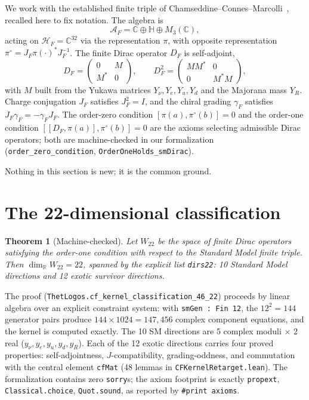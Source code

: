 \documentclass[aps,prd,twocolumn,superscriptaddress,showpacs]{revtex4-2}
\newtheorem{theorem}{Theorem}
\begin{document}
We work with the established finite triple of
Chamseddine--Connes--Marcolli~\cite{CC2007,CCM2007}, recalled here
to fix notation. The algebra is
\begin{equation}
\mathcal{A}_F = \mathbb{C} \oplus \mathbb{H} \oplus M_3(\mathbb{C}),
\end{equation}
acting on $\mathcal{H}_F = \mathbb{C}^{32}$ via the representation
$\pi$, with opposite representation $\pi^\circ = J_F \pi(\cdot)^*
J_F^{-1}$. The finite Dirac operator $D_F$ is self-adjoint,
\[
D_F = \begin{pmatrix} 0 & M \\ M^* & 0 \end{pmatrix},
\qquad D_F^2 = \begin{pmatrix} MM^* & 0 \\ 0 & M^*M \end{pmatrix},
\]
with $M$ built from the Yukawa matrices
$Y_\nu, Y_e, Y_u, Y_d$ and the Majorana mass $Y_R$.
Charge conjugation $J_F$ satisfies $J_F^2 = I$, and the chiral
grading $\gamma_F$ satisfies $J_F \gamma_F = -\gamma_F J_F$.
The order-zero condition $[\pi(a), \pi^\circ(b)] = 0$ and the
order-one condition $[[D_F, \pi(a)], \pi^\circ(b)] = 0$ are the
axioms selecting admissible Dirac operators; both are
machine-checked in our formalization
(\texttt{order\_zero\_condition}, \texttt{OrderOneHolds\_smDirac}).

Nothing in this section is new; it is the common ground.

\section{The 22-dimensional classification}

\begin{theorem}[Machine-checked]
Let $W_{22}$ be the space of finite Dirac operators satisfying
the order-one condition with respect to the Standard Model
finite triple. Then $\dim_{\mathbb{R}} W_{22} = 22$, spanned by
the explicit list \texttt{dirs22}: 10 Standard Model directions
and 12 exotic survivor directions.
\end{theorem}

The proof (\texttt{ThetLogos.cf\_kernel\_classification\_46\_22})
proceeds by linear algebra over an explicit constraint system:
with \texttt{smGen : Fin 12}, the $12^2 = 144$ generator pairs
produce $144 \times 1024 = 147{,}456$ complex component equations,
and the kernel is computed exactly. The 10 SM directions are
5 complex moduli $\times$ 2 real
($y_\nu, y_e, y_u, y_d, y_R$). Each of the 12 exotic directions
carries four proved properties: self-adjointness,
$J$-compatibility, grading-oddness, and commutation with the
central element \texttt{cfMat} (48 lemmas in
\texttt{CFKernelRetarget.lean}). The formalization contains zero
\texttt{sorry}s; the axiom footprint is exactly
\texttt{propext}, \texttt{Classical.choice}, \texttt{Quot.sound},
as reported by \texttt{\#print axioms}.
\end{document}
